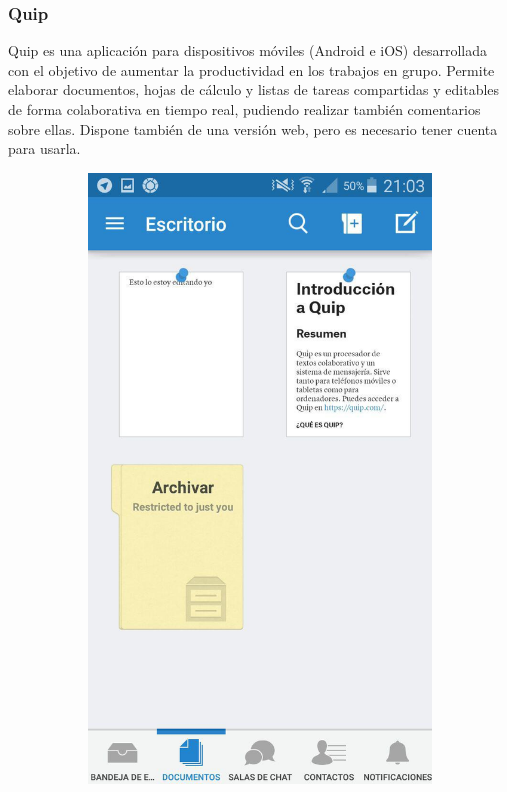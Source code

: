 	
	\subsubsection{Quip}
	
	Quip \cite{ref:quip} es una aplicación para dispositivos móviles (Android e iOS) desarrollada con el objetivo de aumentar la productividad en los trabajos en grupo. Permite elaborar documentos, hojas de cálculo y listas de tareas compartidas y editables de forma colaborativa en tiempo real, pudiendo realizar también comentarios sobre ellas. Dispone también de una versión web, pero es necesario tener cuenta para usarla.
	
	\begin{figure}[H]
        \centering
        \begin{subfigure}[b]{0.3\textwidth}
                \includegraphics[width=\textwidth]{Media/Captures/quipDesktop.jpg}

\end{subfigure}
\end{figure}
